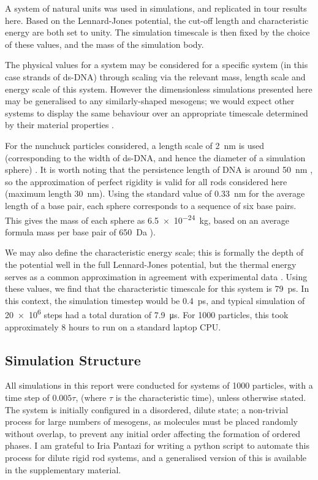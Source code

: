 \documentclass[11pt, a4paper]{article} %
\begin{document}
A system of natural units was used in simulations, and replicated in tour results here. Based on the Lennard-Jones potential, the cut-off length and characteristic energy are both set to unity. The simulation timescale is then fixed by the choice of these values, and the mass of the simulation body. 

The physical values for a system may be considered for a specific system (in this case strands of ds-DNA) through scaling via the relevant mass, length scale and energy scale of this system. However the dimensionless simulations presented here may be generalised to any similarly-shaped mesogens; we would expect other systems to display the same behaviour over an appropriate timescale determined by their material properties \cite{Rapaport2004}.

For the nunchuck particles considered, a length scale of \SI{2}{\nano\metre} is used (corresponding to the width of ds-DNA, and hence the diameter of a simulation sphere) \cite{Arnott1972}. It is worth noting that the persistence length of DNA is around \SI{50}{\nano\metre} \cite{Garcia2007}, so the approximation of perfect rigidity is valid for all rods considered here (maximum length \SI{30}{\nano\metre}). Using the standard value of \SI{0.33}{\nano\metre} \cite{Langridge1960} for the average length of a base pair, each sphere corresponds to a sequence of six base pairs. This gives the mass of each sphere as \SI{6.5e-24}{\kilogram}, based on an average formula mass per base pair of \SI{650}{\dalton} \cite{Duewer2018}). 

We may also define the characteristic energy scale; this is formally the depth of the potential well in the full Lennard-Jones potential, but the thermal energy serves as a common approximation \cite{Pan2010} in agreement with experimental data \cite{Wang2002}. Using these values, we find that the characteristic timescale for this system is \SI{79}{\pico\second}. In this context, the simulation timestep would be \SI{0.4}{\pico\second}, and typical simulation of \num{20e6} steps had a total duration of \SI{7.9}{\micro\second}. For \num{1000} particles, this took approximately $8$ hours to run on a standard laptop CPU. %


\subsection{Simulation Structure}
All simulations in this report were conducted for systems of 1000 particles, with a time step of $0.005\tau$, (where $\tau$ is the characteristic time), unless otherwise stated. The system is initially configured in a disordered, dilute state; a non-trivial process for large numbers of mesogens, as molecules must be placed randomly without overlap, to prevent any initial order affecting the formation of ordered phases. I am grateful to Iria Pantazi for writing a python script to automate this process for dilute rigid rod systems, and a generalised version of this is available in the supplementary material. %
\end{document}
